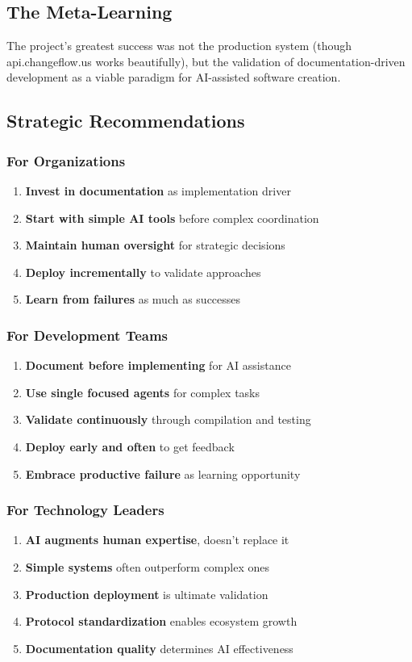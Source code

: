 \documentclass[11pt]{article}
\begin{document}
\subsection{The Meta-Learning}
\label{sec:org6cebbe0}
The project's greatest success was not the production system (though api.changeflow.us works beautifully), but the validation of documentation-driven development as a viable paradigm for AI-assisted software creation.
\subsection{Strategic Recommendations}
\label{sec:orge1cdde9}

\subsubsection{For Organizations}
\label{sec:orgbd6e22a}
\begin{enumerate}
\item \textbf{\textbf{Invest in documentation}} as implementation driver
\item \textbf{\textbf{Start with simple AI tools}} before complex coordination
\item \textbf{\textbf{Maintain human oversight}} for strategic decisions
\item \textbf{\textbf{Deploy incrementally}} to validate approaches
\item \textbf{\textbf{Learn from failures}} as much as successes
\end{enumerate}
\subsubsection{For Development Teams}
\label{sec:orgf06f2e9}
\begin{enumerate}
\item \textbf{\textbf{Document before implementing}} for AI assistance
\item \textbf{\textbf{Use single focused agents}} for complex tasks
\item \textbf{\textbf{Validate continuously}} through compilation and testing
\item \textbf{\textbf{Deploy early and often}} to get feedback
\item \textbf{\textbf{Embrace productive failure}} as learning opportunity
\end{enumerate}
\subsubsection{For Technology Leaders}
\label{sec:org4b1e046}
\begin{enumerate}
\item \textbf{\textbf{AI augments human expertise}}, doesn't replace it
\item \textbf{\textbf{Simple systems}} often outperform complex ones
\item \textbf{\textbf{Production deployment}} is ultimate validation
\item \textbf{\textbf{Protocol standardization}} enables ecosystem growth
\item \textbf{\textbf{Documentation quality}} determines AI effectiveness
\end{enumerate}
\end{document}
